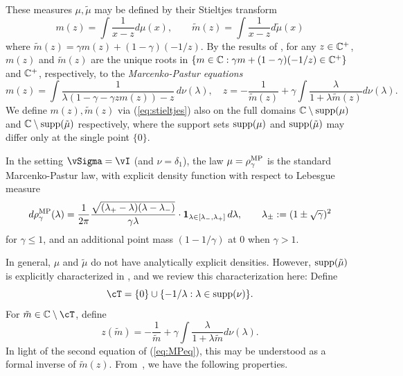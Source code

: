 These measures $\mu,\tilde\mu$ may be defined by their Stieltjes transform
\begin{equation}\label{eq:stieltjes}
m(z)=\int \frac{1}{x-z}d\mu(x), \qquad
\tilde m(z)=\int \frac{1}{x-z}d\tilde \mu(x)
\end{equation}
where $\tilde m(z)=\gamma m(z)+(1-\gamma)(-1/z)$. 
By the results of \citep{marchenko1967,silverstein1995empirical},
for any $z \in \mathbb{C}^+$, $m(z)$ and $\tilde m(z)$ are the unique roots in
$\{m \in \mathbb{C}:\gamma m+(1-\gamma)(-1/z) \in\mathbb{C}^+\}$ and $\mathbb{C}^+$, respectively,
to the \textit{Marcenko-Pastur equations}
\begin{equation}\label{eq:MPeq}
m(z)=\int \frac{1}{\lambda(1-\gamma-\gamma z m(z))-z}\,d\nu(\lambda), \quad
z=-\frac{1}{\tilde m(z)}+\gamma \int \frac{\lambda}{1+\lambda
\tilde m(z)}d\nu(\lambda).
\end{equation}
We define $m(z),\tilde m(z)$ via (\ref{eq:stieltjes}) also on the full domains
$\mathbb{C} \setminus \mathrm{supp}({\mu})$ and $\mathbb{C} \setminus \mathrm{supp}({\tilde \mu})$ respectively,
where the support sets $\mathrm{supp}({\mu})$ and $\mathrm{supp}({\tilde \mu})$ may differ only at
the single point $\{0\}$.

In the setting $\vSigma=\vI$ (and $\nu=\delta_1$), the law $\mu=\rho_\gamma^{\textnormal{MP}}$
is the standard Marcenko-Pastur law, with explicit density function with respect
to Lebesgue measure
\[d\rho_\gamma^{\textnormal{MP}}(\lambda)=\frac{1}{2\pi}\frac{\sqrt{(\lambda_{+}-\lambda)(\lambda-\lambda_{-})}}{\gamma\lambda}\cdot\mathbf{1}_{\lambda
\in [\lambda_{-},\lambda_+]}\,d\lambda, \qquad \lambda_{\pm}:=(1\pm\sqrt{\gamma})^2\]
for $\gamma \leq 1$, and an additional point mass $(1-1/\gamma)$ at 0
when $\gamma>1$.

In general, $\mu$ and $\tilde \mu$ do not have analytically
explicit densities. However, $\mathrm{supp}({\tilde \mu})$ is explicitly
characterized in \cite{silverstein1995analysis}, and we review this
characterization here: Define
\begin{equation}\label{eq:zdomain}
\cT=\{0\} \cup \{-1/\lambda:\lambda \in \supp{\nu}\}.
\end{equation}
For $\tilde m \in \C \setminus \cT$, define
\begin{equation}\label{eq:inv_z}
z(\tilde m)={-}\frac{1}{\tilde m}+\gamma \int\frac{\lambda}{1+\lambda \tilde m}d\nu(\lambda).
\end{equation}	
In light of the second equation of (\ref{eq:MPeq}), this may be understood as
a formal inverse of $\tilde m(z)$.
From~\cite[Theorems 4.1 and 4.2]{silverstein1995analysis},
we have the following properties.

